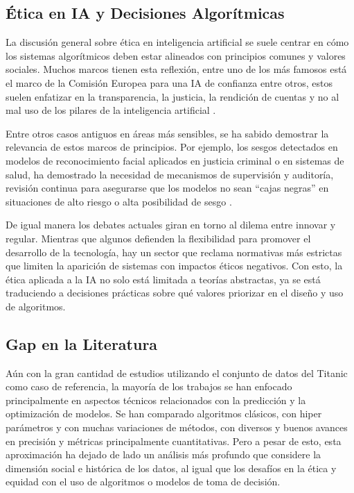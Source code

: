 \documentclass[conference]{IEEEtran}
\begin{document}
\subsection{Ética en IA y Decisiones Algorítmicas}

La discusión general sobre ética en inteligencia artificial se suele centrar en cómo los sistemas algorítmicos deben estar alineados con principios comunes y valores sociales. Muchos marcos tienen esta reflexión, entre uno de los más famosos está el marco de la Comisión Europea para una IA de confianza entre otros, estos suelen enfatizar en la transparencia, la justicia, la rendición de cuentas y no al mal uso de los pilares de la inteligencia artificial \cite{bordt2024}. 

Entre otros casos antiguos en áreas más sensibles, se ha sabido demostrar la relevancia de estos marcos de principios. Por ejemplo, los sesgos detectados en modelos de reconocimiento facial aplicados en justicia criminal o en sistemas de salud, ha demostrado la necesidad de mecanismos de supervisión y auditoría, revisión continua para asegurarse que los modelos no sean “cajas negras” en situaciones de alto riesgo o alta posibilidad de sesgo \cite{patil2023}. 

De igual manera los debates actuales giran en torno al dilema entre innovar y regular. Mientras que algunos defienden la flexibilidad para promover el desarrollo de la tecnología, hay un sector que reclama normativas más estrictas que limiten la aparición de sistemas con impactos éticos negativos. Con esto, la ética aplicada a la IA no solo está limitada a teorías abstractas, ya se está traduciendo a decisiones prácticas sobre qué valores priorizar en el diseño y uso de algoritmos.



\subsection{Gap en la Literatura}

Aún con la gran cantidad de estudios utilizando el conjunto de datos del Titanic como caso de referencia, la mayoría de los trabajos se han enfocado principalmente en aspectos técnicos relacionados con la predicción y la optimización de modelos. Se han comparado algoritmos clásicos, con hiper parámetros y con muchas variaciones de métodos, con diversos y buenos avances en precisión y métricas principalmente cuantitativas. Pero a pesar de esto, esta aproximación ha dejado de lado un análisis más profundo que considere la dimensión social e histórica de los datos, al igual que los desafíos en la ética y equidad con el uso de algoritmos o modelos de toma de decisión.
\end{document}
